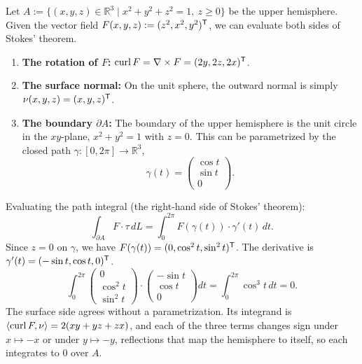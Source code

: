 \begin{example}
\label{ex:stokes_hemisphere}
Let $A := \{(x,y,z) \in \mathbb{R}^3 \mid x^2+y^2+z^2=1,\ z \geq 0\}$ be the upper hemisphere.
Given the vector field $F(x,y,z) := (z^2, x^2, y^2)^{\mathsf{T}}$, we can evaluate both sides of Stokes' theorem.
\begin{enumerate}[label=\textbf{(\alph*)}]
    \item \textbf{The rotation of $F$:} $\operatorname{curl} F = \nabla \times F = (2y, 2z, 2x)^{\mathsf{T}}$.
    \item \textbf{The surface normal:} On the unit sphere, the outward normal is simply $\nu(x,y,z) = (x,y,z)^{\mathsf{T}}$.
    \item \textbf{The boundary $\partial A$:} The boundary of the upper hemisphere is the unit circle in the $xy$-plane, $x^2+y^2=1$ with $z=0$. This can be parametrized by the closed path $\gamma : [0,2\pi] \to \mathbb{R}^3$,
    \[\gamma(t) = \begin{pmatrix} \cos t \\ \sin t \\ 0 \end{pmatrix}.\]
\end{enumerate}
Evaluating the path integral (the right-hand side of Stokes' theorem):
\[\int_{\partial A} F \cdot \tau \,dL = \int_0^{2\pi} F(\gamma(t)) \cdot \gamma'(t) \,dt.\]
Since $z=0$ on $\gamma$, we have $F(\gamma(t)) = (0, \cos^2 t, \sin^2 t)^{\mathsf{T}}$. The derivative is $\gamma'(t) = (-\sin t, \cos t, 0)^{\mathsf{T}}$.
\[\int_0^{2\pi} \begin{pmatrix} 0 \\ \cos^2 t \\ \sin^2 t \end{pmatrix} \cdot \begin{pmatrix} -\sin t \\ \cos t \\ 0 \end{pmatrix} dt = \int_0^{2\pi} \cos^3 t \,dt = 0.\]
The surface side agrees without a parametrization. Its integrand is
$\langle\operatorname{curl} F,\nu\rangle = 2(xy + yz + zx)$, and each of the three terms changes sign under
$x \mapsto -x$ or under $y \mapsto -y$, reflections that map the hemisphere to itself, so each
integrates to $0$ over $A$.
\end{example}

